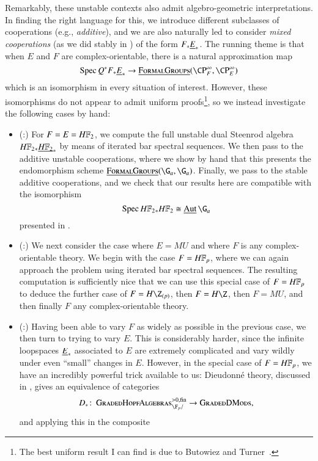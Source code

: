 Remarkably, these unstable contexts also admit algebro-geometric interpretations.  In finding the right language for this, we introduce different subclasses of cooperations (e.g., \textit{additive}), and we are also naturally led to consider \textit{mixed cooperations} (as we did stably in ) of the form $F_* \underline{\smash{E}}_{*}$.  The running theme is that when $E$ and $F$ are complex-orientable, there is a natural approximation map \[\Spec Q^* F_* \OS{E}{*} \to \InternalHom{FormalGroups}(\CP^\infty_F, \CP^\infty_E)\] which is an isomorphism in every situation of interest.  However, these isomorphisms do not appear to admit uniform proofs\footnote{The best uniform result I can find is due to Butowiez and Turner~\cite[Theorem 3.12]{ButowiezTurner}.}, so we instead investigate the following cases by hand:
\begin{itemize}
\item (:) For $F = E = \HFtwo$, we compute the full unstable dual Steenrod algebra $\HFtwo_* \OS{\HFtwo}{*}$ by means of iterated bar spectral sequences.  We then pass to the additive unstable cooperations, where we show by hand that this presents the endomorphism scheme $\InternalHom{FormalGroups}(\G_a, \G_a)$.  Finally, we pass to the stable additive cooperations, and we check that our results here are compatible with the isomorphism \[\Spec \HFtwo_* \HFtwo \cong \InternalAut{\G_a}\] presented in .
\item (:) We next consider the case where $E = MU$ and where $F$ is any complex-orientable theory.  We begin with the case $F = \HFp$, where we can again approach the problem using iterated bar spectral sequences.  The resulting computation is sufficiently nice that we can use this special case of $F = \HFp$ to deduce the further case of $F = H\Z_{(p)}$, then $F = H\Z$, then $F = MU$, and then finally $F$ any complex-orientable theory.
\item (:) Having been able to vary $F$ as widely as possible in the previous case, we then turn to trying to vary $E$.  This is considerably harder, since the infinite loopspaces $\underline{\smash{E}}_{*}$ associated to $E$ are extremely complicated and vary wildly under even ``small'' changes in $E$.  However, in the special case of $F = \HFp$, we have an incredibly powerful trick available to us: Dieudonn\'e theory, discussed in , gives an equivalence of categories \[D_*\co \CatOf{GradedHopfAlgebras}^{> 0, \fin}_{\F_p/} \to \CatOf{GradedDMods},\] and applying this in the composite

\end{itemize}
